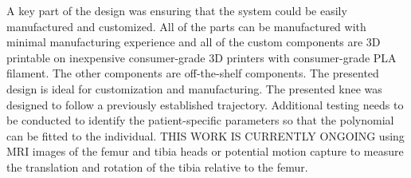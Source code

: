 A key part of the design was ensuring that the system could be easily manufactured and customized. All of the parts can be manufactured with minimal manufacturing experience and all of the custom components are 3D printable on inexpensive consumer-grade 3D printers with consumer-grade PLA filament. The other components are off-the-shelf components. The presented design is ideal for customization and manufacturing. The presented knee was designed to follow a previously established trajectory. Additional testing needs to be conducted to identify the patient-specific parameters so that the polynomial can be fitted to the individual. THIS WORK IS CURRENTLY ONGOING using MRI images of the femur and tibia heads or potential motion capture to measure the translation and rotation of the tibia relative to the femur. 

\begin{figure}
    \centering

\end{figure}
